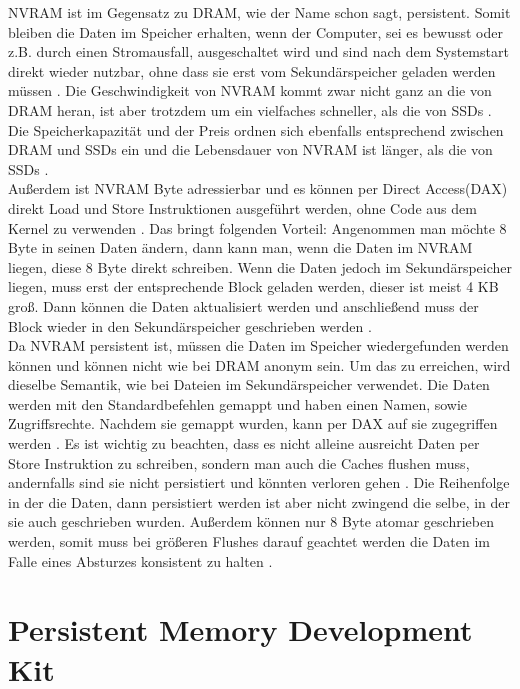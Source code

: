 \documentclass{class/thesis}
\begin{document}
\begin{thesis}
	NVRAM ist im Gegensatz zu DRAM, wie der Name schon sagt, persistent. Somit bleiben die Daten im Speicher erhalten, wenn der Computer, sei es bewusst oder z.B. durch einen Stromausfall, ausgeschaltet wird und sind  nach dem Systemstart direkt wieder nutzbar, ohne dass sie erst vom Sekundärspeicher geladen werden müssen \cite{Scargall:2020:PPM}.
	Die Geschwindigkeit von NVRAM kommt zwar nicht ganz an die von DRAM heran, ist aber trotzdem um ein vielfaches schneller, als die von SSDs \cite{PMEM.IO:Introduction}.
	Die Speicherkapazität und der Preis ordnen sich ebenfalls entsprechend zwischen DRAM und SSDs ein \cite{PMEM.IO:Introduction} und die Lebensdauer von NVRAM ist länger, als die von SSDs \cite{Scargall:2020:PPM}. \\
	Außerdem ist NVRAM Byte adressierbar und es können per \glqq{}Direct Access\grqq{}(DAX) direkt Load und Store Instruktionen ausgeführt werden, ohne Code aus dem Kernel zu verwenden \cite{Rudoff:2017:PMP}. 
	Das bringt folgenden Vorteil: Angenommen man möchte 8 Byte in seinen Daten ändern, dann kann man, wenn die Daten im NVRAM liegen, diese 8 Byte direkt schreiben. Wenn die Daten jedoch im Sekundärspeicher liegen, muss erst der entsprechende Block geladen werden, dieser ist meist 4 KB groß. Dann können die Daten aktualisiert werden und anschließend muss der Block wieder in den Sekundärspeicher geschrieben werden \cite{Scargall:2020:PPM}. \\
	Da NVRAM persistent ist, müssen die Daten im Speicher wiedergefunden werden können und können nicht wie bei DRAM anonym sein. Um das zu erreichen, wird dieselbe Semantik, wie bei Dateien im Sekundärspeicher verwendet. Die Daten werden mit den Standardbefehlen gemappt und haben einen Namen, sowie Zugriffsrechte. Nachdem sie gemappt wurden, kann per DAX auf sie zugegriffen werden \cite{Rudoff:2017:PMP}. Es ist wichtig zu beachten, dass es nicht alleine ausreicht Daten per Store Instruktion zu schreiben, sondern man auch die Caches flushen muss, andernfalls sind sie nicht persistiert und könnten verloren gehen \cite{Rudoff:2017:PMP}.
	Die Reihenfolge in der die Daten, dann persistiert werden ist aber nicht zwingend die selbe, in der sie auch geschrieben wurden.
	Außerdem können nur 8 Byte atomar geschrieben werden, somit muss bei größeren Flushes darauf geachtet werden die Daten im Falle eines Absturzes konsistent zu halten \cite{PMEM.IO:Introduction}.
	
	
	
	\section{Persistent Memory Development Kit}
	

\end{thesis}
\end{document}
